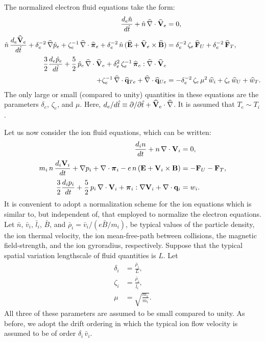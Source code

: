 \documentclass[notitlepage,12pt]{article}
\newcommand{\bpi}{\mbox{\boldmath$\pi$}}
\begin{document}
The normalized electron fluid equations take the form:
\begin{align}
\frac{d_e \hat{n}}{d\hat{t}} + \hat{n}\,\widehat{\nabla}\cdot\widehat{\bf V}_e &=0,\label{e3.113a}\\[0.5ex]
\hat{n}\,\frac{d_e \widehat{\bf V}_e}{d\hat{t}} +
\delta_e^{-2}\,\widehat{\nabla}\hat{p}_e +\zeta_e^{-1}\,\widehat{\nabla}
\cdot\widehat{\bpi}_e  
+ \delta_e^{-2}\,\hat{n}\,(\widehat{\bf E} + \widehat{\bf V}_e
\times\widehat{\bf B}) &= \delta_e^{-2}\,\zeta_e\,\widehat{\bf F}_U +\delta_e^{-2}\,\widehat{\bf F}_T, \\[0.5ex]
\frac{3}{2}\frac{d_e \hat{p}_e}{d\hat{t}} + \frac{5}{2}\,
\hat{p}_e\,\widehat{\nabla}\cdot\widehat{\bf V}_e + \delta_e^{2}\,
\zeta_e^{-1}\,\widehat{\bpi}_e : \widehat{\nabla}\cdot\widehat{\bf V}_e&\nonumber\label{e3.113c}\\[0.5ex] 
+\zeta_e^{-1} \,\widehat{\nabla}\cdot\widehat{\bf q}_{Te}
 +\widehat{\nabla}\cdot\widehat{\bf q}_{Ue} 
&= -\delta_e^{-2}\,\zeta_e\,\mu^2\,\widehat{w}_i + \zeta_e\,
\widehat{w}_U +\widehat{w}_T.
\end{align}
The only large or small (compared to unity) quantities in these equations are the
parameters $\delta_e$, $\zeta_e$, and $\mu$. 
Here, $d_e/d\hat{t}\equiv\partial /\partial\hat{t} +
 \widehat{\bf V}_e\cdot\widehat{\nabla}$. It is assumed that $T_e\sim T_i$.

Let us now consider the ion fluid equations, which can be written:
\begin{align}
\frac{d_i n}{dt} + n\,\nabla\cdot{\bf V}_i &= 0,\\[0.5ex]
m_i\, n\,\frac{d_i {\bf V}_i}{dt} + \nabla p_i + \nabla\cdot \bpi_i - e\, n\,
({\bf E} + {\bf V}_i\times {\bf B})& =- {\bf F}_U -{\bf F}_T,\\[0.5ex]
\frac{3}{2}\frac{d_i p_i}{dt} + \frac{5}{2}\,p_i\,\nabla \cdot {\bf V}_i
+ \bpi_i:\nabla{\bf V}_i+ \nabla\cdot{\bf q}_i & =w_i.
\end{align}
It is convenient to adopt a normalization scheme for the ion equations
which is similar to, but independent of, that employed to normalize the
electron equations. Let  $\bar{n}$, $\bar{v}_i$, $\bar{l}_i$, $\bar{B}$,
and $\bar{\rho}_i =\bar{ v}_i/(e\bar{B}/m_i)$,  be typical values
of the particle density, the ion  thermal velocity, the ion
mean-free-path between collisions,  the magnetic field-strength, and the
ion gyroradius,  respectively. 
Suppose that 
the typical spatial variation lengthscale of fluid quantities is $L$. Let
 \begin{align}
\delta_i &= \frac{\bar{\rho}_i}{L},\\[0.5ex]
\zeta_i &= \frac{\bar{\rho}_i}{\bar{l}_i},\\[0.5ex]
\mu &= \sqrt{\frac{m_e}{m_i}}.
\end{align}
All three of these parameters are assumed to be  small 
compared to unity.  As before, we adopt the drift ordering in which the typical ion flow velocity is assumed to be of order $\delta_i\,\bar{v}_i$. 
\end{document}
